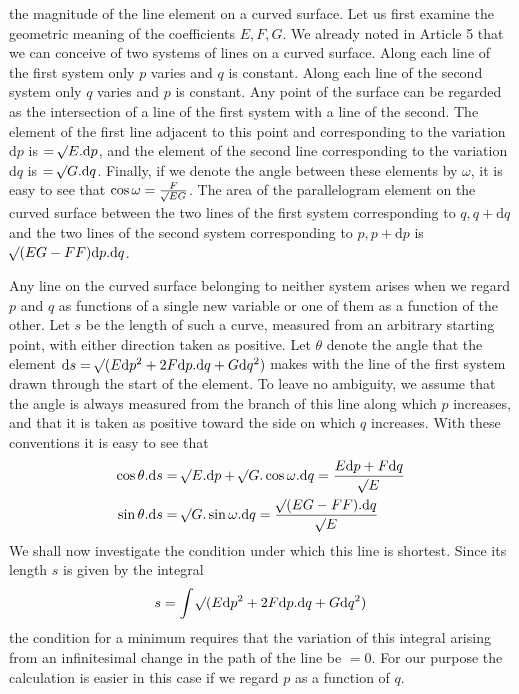%
the magnitude of the line element on a curved surface. Let us first examine the geometric meaning of the coefficients \(E,F,G\). We already noted in Article 5 that we can conceive of two systems of lines on a curved surface. Along each line of the first system only \(p\) varies and \(q\) is constant. Along each line of the second system only \(q\) varies and \(p\) is constant. Any point of the surface can be regarded as the intersection of a line of the first system with a line of the second. The element of the first line adjacent to this point and corresponding to the variation \(\mathrm{d}p\) is \(=\mathord{{}^{}\!\surd}E\mathord{.}\mathrm{d}p\), and the element of the second line corresponding to the variation \(\mathrm{d}q\) is \(=\mathord{{}^{}\!\surd}G\mathord{.}\mathrm{d}q\). Finally, if we denote the angle between these elements by \(\omega\), it is easy to see that \(\cos\omega=\frac{F}{\mathord{{}^{}\!\surd}EG}\). The area of the parallelogram element on the curved surface between the two lines of the first system corresponding to \(q,q+\mathrm{d}q\) and the two lines of the second system corresponding to \(p,p+\mathrm{d}p\) is \(\mathord{{}^{}\!\surd}(EG-FF)\mathrm{d}p\mathord{.}\mathrm{d}q\).

Any line on the curved surface belonging to neither system arises when we regard \(p\) and \(q\) as functions of a single new variable or one of them as a function of the other. Let \(s\) be the length of such a curve, measured from an arbitrary starting point, with either direction taken as positive. Let \(\theta\) denote the angle that the element \(\mathrm{d}s=\mathord{{}^{}\!\surd}(E\mathrm{d}p^2+2F\mathrm{d}p\mathord{.}\mathrm{d}q+G\mathrm{d}q^2)\) makes with the line of the first system drawn through the start of the element. To leave no ambiguity, we assume that the angle is always measured from the branch of this line along which \(p\) increases, and that it is taken as positive toward the side on which \(q\) increases. With these conventions it is easy to see that
\[
\begin{aligned}
\cos\theta\mathord{.}\mathrm{d}s&=\mathord{{}^{}\!\surd}E\mathord{.}\mathrm{d}p+\mathord{{}^{}\!\surd}G\mathord{.}\cos\omega\mathord{.}\mathrm{d}q=\frac{E\mathrm{d}p+F\mathrm{d}q}{\mathord{{}^{}\!\surd}E}\\
\sin\theta\mathord{.}\mathrm{d}s&=\mathord{{}^{}\!\surd}G\mathord{.}\sin\omega\mathord{.}\mathrm{d}q=\frac{\mathord{{}^{}\!\surd}(EG-FF)\mathord{.}\mathrm{d}q}{\mathord{{}^{}\!\surd}E}
\end{aligned}
\]
We shall now investigate the condition under which this line is shortest. Since its length \(s\) is given by the integral
\[
s=\int\mathord{{}^{}\!\surd}(E\mathrm{d}p^2+2F\mathrm{d}p\mathord{.}\mathrm{d}q+G\mathrm{d}q^2)
\]
the condition for a minimum requires that the variation of this integral arising from an infinitesimal change in the path of the line be \(=0\). For our purpose the calculation is easier in this case if we regard \(p\) as a function of \(q\).
